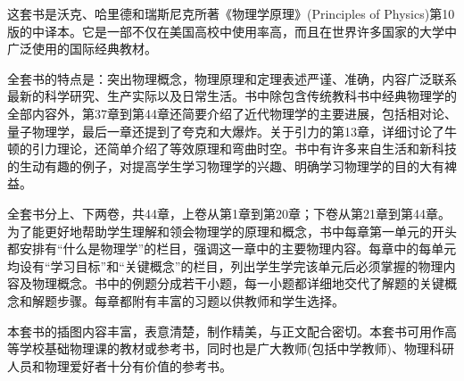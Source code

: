 
    这套书是沃克、哈里德和瑞斯尼克所著《物理学原理》(Principles of Physics)第10版的中译本。它是一部不仅在美国高校中使用率高，而且在世界许多国家的大学中广泛使用的国际经典教材。
    
    全套书的特点是：突出物理概念，物理原理和定理表述严谨、准确，内容广泛联系最新的科学研究、生产实际以及日常生活。书中除包含传统教科书中经典物理学的全部内容外，第37章到第44章还简要介绍了近代物理学的主要进展，包括相对论、量子物理学，最后一章还提到了夸克和大爆炸。关于引力的第13章，详细讨论了牛顿的引力理论，还简单介绍了等效原理和弯曲时空。书中有许多来自生活和新科技的生动有趣的例子，对提高学生学习物理学的兴趣、明确学习物理学的目的大有裨益。
    
    全套书分上、下两卷，共44章，上卷从第1章到第20章；下卷从第21章到第44章。为了能更好地帮助学生理解和领会物理学的原理和概念，书中每章第一单元的开头都安排有“什么是物理学”的栏目，强调这一章中的主要物理内容。每章中的每单元均设有“学习目标”和“关键概念”的栏目，列出学生学完该单元后必须掌握的物理内容及物理概念。书中的例题分成若干小题，每一小题都详细地交代了解题的关键概念和解题步骤。每章都附有丰富的习题以供教师和学生选择。
    
    本套书的插图内容丰富，表意清楚，制作精美，与正文配合密切。本套书可用作高等学校基础物理课的教材或参考书，同时也是广大教师(包括中学教师)、物理科研人员和物理爱好者十分有价值的参考书。
    
		
\thispagestyle{empty}
